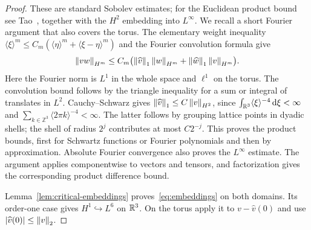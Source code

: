 \begin{proof}
These are standard Sobolev estimates; for the Euclidean product bound
see Tao~\cite[Appendix~A, Lemma~A.8]{taodispersive}, together with the
$H^2$ embedding into $L^\infty$. We recall a short Fourier argument
that also covers the torus.
The elementary weight inequality
$\langle\xi\rangle^m\le C_m(\langle\eta\rangle^m+
\langle\xi-\eta\rangle^m)$ and the Fourier convolution formula give
\[
 \left\lVert vw\right\rVert_{H^m}\le C_m\bigl(\left\lVert\widehat v\right\rVert_1\left\lVert w\right\rVert_{H^m}
                            +\left\lVert\widehat w\right\rVert_1\left\lVert v\right\rVert_{H^m}\bigr).
\]
Here the Fourier norm is $L^1$ in the whole space and $\ell^1$ on the
torus. The convolution bound follows by the triangle inequality for a
sum or integral of translates in $L^2$. Cauchy--Schwarz gives
$\left\lVert\widehat v\right\rVert_1\le C\left\lVert v\right\rVert_{H^2}$, since
$\int_{\mathbb R^3}\langle\xi\rangle^{-4}\,\mathrm d\xi<\infty$ and
$\sum_{k\in\mathbb Z^3}\langle2\pi k\rangle^{-4}<\infty$.
The latter follows by grouping lattice points in dyadic shells; the
shell of radius $2^j$ contributes at most $C2^{-j}$.
This proves the product bounds, first for Schwartz functions or Fourier
polynomials and then by approximation. Absolute Fourier convergence
also proves the $L^\infty$ estimate. The argument applies componentwise
to vectors and tensors, and factorization gives the corresponding
product difference bound.

Lemma~\ref{lem:critical-embeddings} proves~\eqref{eq:embeddings} on both
domains. Its order-one case gives $H^1\hookrightarrow L^6$ on $\mathbb R^3$.
On the torus apply it to $v-\widehat v(0)$ and use
$|\widehat v(0)|\le\left\lVert v\right\rVert_2$.
\end{proof}

